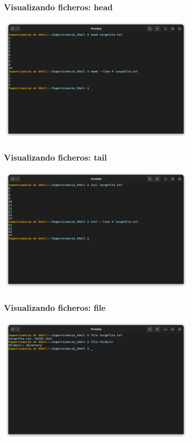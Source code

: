 \documentclass[10pt]{beamer}
\begin{document}
	\begin{frame}
		\frametitle{Visualizando ficheros: head}
		\includegraphics[width=0.75\textwidth]{head}
	\end{frame}	
	
	\begin{frame}
		\frametitle{Visualizando ficheros: tail}
		\includegraphics[width=0.75\textwidth]{tail}
	\end{frame}
		
	\begin{frame}
		\frametitle{Visualizando ficheros: file}
		\includegraphics[width=0.75\textwidth]{file}
	\end{frame}
		
\end{document}
